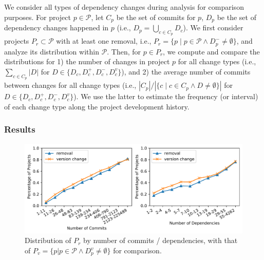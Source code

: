 \documentclass[sigconf, screen]{acmart}
\begin{document}
We consider all types of dependency changes during analysis for comparison purposes.
For project $p \in \mathcal{P}$, let $C_p$ be the set of commits for $p$, $D_p$ be the set of dependency changes happened in $p$ (i.e., $D_p=\bigcup_{c \in C_p}D_c$).
We first consider projects $P_r \subset \mathcal{P}$ with at least one removal, i.e., $P_r=\{p \mid p\in \mathcal{P} \land D_p^- \ne \emptyset\}$, and analyze its distribution within $\mathcal{P}$.
Then, for $p\in P_r$, we compute and compare the distributions for 1) the number of changes in project $p$ for all change types (i.e., $\sum_{c \in C_p} |D|$ for $D \in \{D_c, D_c^+, D_c^-, D_c^v\}$), and 2) the average number of commits between changes for all change types (i.e.,  $|C_p| / |\{c \mid c \in C_p \land D \ne \emptyset\}|$ for $D \in \{D_c, D_c^+, D_c^-, D_c^v\}$).
We use the latter to estimate the frequency (or interval) of each change type along the project development history.

\subsubsection{Results}

\begin{figure}[t]
  \centering
  \includegraphics[width=\linewidth]{fig/chgrel.pdf}
\vspace{-7mm}
  \caption{Distribution of $P_r$ by number of commits / dependencies, with that of $P_v=\{p|p\in \mathcal{P} \land D_p^v \ne \emptyset\}$ for comparison.}
  \label{fig:chgrel}
\vspace{-4mm}
\end{figure}
\end{document}
